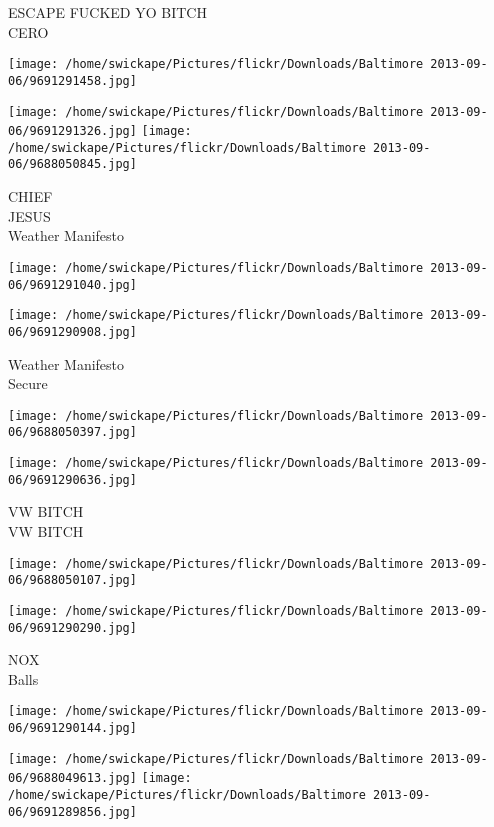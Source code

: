 \documentclass[10pt,letterpaper]{article}
\begin{document}
ESCAPE FUCKED YO BITCH\\
CERO\\
\pagebreak

\texttt{[image: /home/swickape/Pictures/flickr/Downloads/Baltimore 2013-09-06/9691291458.jpg]}

\vspace{0.25in}
\texttt{[image: /home/swickape/Pictures/flickr/Downloads/Baltimore 2013-09-06/9691291326.jpg]}
\texttt{[image: /home/swickape/Pictures/flickr/Downloads/Baltimore 2013-09-06/9688050845.jpg]}

CHIEF\\
JESUS\\
Weather Manifesto\\
\pagebreak

\texttt{[image: /home/swickape/Pictures/flickr/Downloads/Baltimore 2013-09-06/9691291040.jpg]}

\vspace{0.25in}
\texttt{[image: /home/swickape/Pictures/flickr/Downloads/Baltimore 2013-09-06/9691290908.jpg]}

Weather Manifesto\\
Secure\\
\pagebreak

\texttt{[image: /home/swickape/Pictures/flickr/Downloads/Baltimore 2013-09-06/9688050397.jpg]}

\vspace{0.25in}
\texttt{[image: /home/swickape/Pictures/flickr/Downloads/Baltimore 2013-09-06/9691290636.jpg]}

VW BITCH\\
VW BITCH\\
\pagebreak

\texttt{[image: /home/swickape/Pictures/flickr/Downloads/Baltimore 2013-09-06/9688050107.jpg]}

\vspace{0.25in}
\texttt{[image: /home/swickape/Pictures/flickr/Downloads/Baltimore 2013-09-06/9691290290.jpg]}

NOX\\
Balls\\
\pagebreak

\texttt{[image: /home/swickape/Pictures/flickr/Downloads/Baltimore 2013-09-06/9691290144.jpg]}

\vspace{0.25in}
\texttt{[image: /home/swickape/Pictures/flickr/Downloads/Baltimore 2013-09-06/9688049613.jpg]}
\texttt{[image: /home/swickape/Pictures/flickr/Downloads/Baltimore 2013-09-06/9691289856.jpg]}
\end{document}
